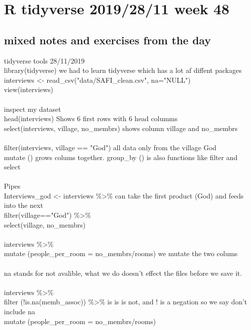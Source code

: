 \documentclass{article}
\begin{document}
\section{R tidyverse 2019/28/11 week 48}
\subsection{mixed notes and exercises from the day }   
tidyverse tools 28/11/2019 \\
library(tidyverse) we had to learn tidyverse which has a lot af diffent packages\\
interviews \textless- read\_csv("data/SAFI\_clean.csv", na="NULL")\\
view(interviews)\\\\

inspect my dataset\\
head(interviews)   Shows 6 first rows with 6 head columms\\
select(interviews, village, no\_membrs)   shows column village and no\_membrs \\\\

filter(interviews, village == "God")   all data only from the village God\\
  mutate () grows colums together. group\_by () is also functions like filter and select\\\\

Pipes\\
Interviews\_god \textless- interviews \%\textgreater\% can take the first product (God) and feeds into the next \\
  filter(village=="God") \%\textgreater\%\\
  select(village, no\_membrs)\\\\

interviews \%\textgreater\%\\
  mutate (people\_per\_room = no\_membrs/rooms)   we mutate the two colums\\\\

  na stands for not avalible, what we do doesn't effect the files before we save it. \\\\

interviews \%\textgreater\%\\
  filter (!is.na(memb\_assoc)) \%\textgreater\%   is is is not, and ! is a negation so we say don't include na\\
  mutate (people\_per\_room = no\_membrs/rooms)\\\\
\end{document}

